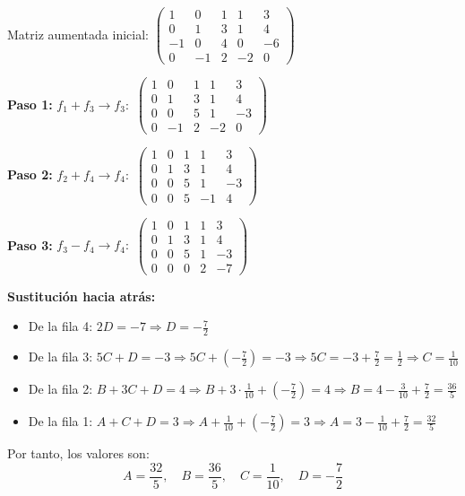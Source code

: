 \begin{prob}
\begin{myproof}
Matriz aumentada inicial:
$\left(\begin{array}{cccc|c}
1 & 0 & 1 & 1 & 3 \\
0 & 1 & 3 & 1 & 4 \\
-1 & 0 & 4 & 0 & -6 \\
0 & -1 & 2 & -2 & 0
\end{array}\right)$

\textbf{Paso 1:} $f_1 + f_3 \to f_3:$ $\left(\begin{array}{cccc|c}
1 & 0 & 1 & 1 & 3 \\
0 & 1 & 3 & 1 & 4 \\
0 & 0 & 5 & 1 & -3 \\
0 & -1 & 2 & -2 & 0
\end{array}\right)$

\textbf{Paso 2:} $f_2 + f_4 \to f_4:$  $\left(\begin{array}{cccc|c}
1 & 0 & 1 & 1 & 3 \\
0 & 1 & 3 & 1 & 4 \\
0 & 0 & 5 & 1 & -3 \\
0 & 0 & 5 & -1 & 4
\end{array}\right)$

\textbf{Paso 3:} $f_3 - f_4 \to f_4:$ $\left(\begin{array}{cccc|c}
1 & 0 & 1 & 1 & 3 \\
0 & 1 & 3 & 1 & 4 \\
0 & 0 & 5 & 1 & -3 \\
0 & 0 & 0 & 2 & -7
\end{array}\right)$

\textbf{Sustitución hacia atrás:}
\begin{itemize}
\item De la fila 4: $2D = -7 \Rightarrow D = -\frac{7}{2}$

\item De la fila 3: $5C + D = -3 \Rightarrow 5C + \left(-\frac{7}{2}\right) = -3 \Rightarrow 5C = -3 + \frac{7}{2} = \frac{1}{2} \Rightarrow C = \frac{1}{10}$

\item De la fila 2: $B + 3C + D = 4 \Rightarrow B + 3 \cdot \frac{1}{10} + \left(-\frac{7}{2}\right) = 4 \Rightarrow B = 4 - \frac{3}{10} + \frac{7}{2} = \frac{36}{5}$

\item De la fila 1: $A + C + D = 3 \Rightarrow A + \frac{1}{10} + \left(-\frac{7}{2}\right) = 3 \Rightarrow A = 3 - \frac{1}{10} + \frac{7}{2} = \frac{32}{5}$
\end{itemize}
Por tanto, los valores son:
$$A = \frac{32}{5}, \quad B = \frac{36}{5}, \quad C = \frac{1}{10}, \quad D = -\frac{7}{2}$$
\end{myproof}
\end{prob}
 




